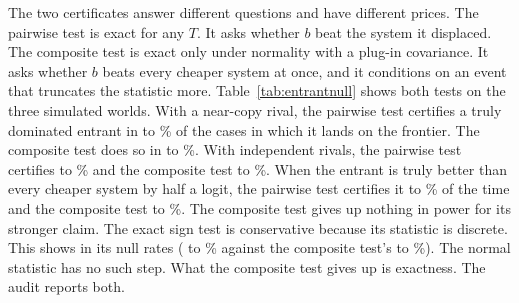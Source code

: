\documentclass[11pt]{article}
\begin{document}
The two certificates answer different questions and have different prices. The pairwise test is exact for any $T$. It asks whether $b$ beat the system it displaced. The composite test is exact only under normality with a plug-in covariance. It asks whether $b$ beats every cheaper system at once, and it conditions on an event that truncates the statistic more. Table~\ref{tab:entrantnull} shows both tests on the three simulated worlds. With a near-copy rival, the pairwise test certifies a truly dominated entrant in \NumEntrantNullCopyMin{} to \NumEntrantNullCopyMax\% of the cases in which it lands on the frontier. The composite test does so in \NumEntrantNullIUCopyMin{} to \NumEntrantNullIUCopyMax\%. With independent rivals, the pairwise test certifies \NumEntrantNullIndepMin{} to \NumEntrantNullIndepMax\% and the composite test \NumEntrantNullIUIndepMin{} to \NumEntrantNullIUIndepMax\%. When the entrant is truly better than every cheaper system by half a logit, the pairwise test certifies it \NumEntrantPowerMin{} to \NumEntrantPowerMax\% of the time and the composite test \NumEntrantPowerIUMin{} to \NumEntrantPowerIUMax\%. The composite test gives up nothing in power for its stronger claim. The exact sign test is conservative because its statistic is discrete. This shows in its null rates (\NumEntrantNullIndepMin{} to \NumEntrantNullIndepMax\% against the composite test's \NumEntrantNullIUIndepMin{} to \NumEntrantNullIUIndepMax\%). The normal statistic has no such step. What the composite test gives up is exactness. The audit reports both.

\begin{table}[!tbp]
\centering\small
\resizebox{\textwidth}{!}{}
\caption{What the two certificates control, \NumEntrantNullR{} boards per row. In the two null worlds, a cheaper independent system with the entrant's true accuracy dominates it. The near-copy rows add a degraded copy of the entrant to the pool. The flip rate is 0.2 at 50 to 150 tasks and 0.05 at 300 tasks. The closer copy is the case the impossibility result is about. In the last block, the entrant is truly better than every cheaper system by half a logit. Rates are over the boards on which the entrant landed on the observed frontier. A valid Pareto certificate must stay at or below 5\% in the null rows.}
\label{tab:entrantnull}
\end{table}
\end{document}
